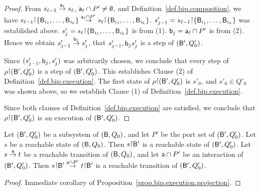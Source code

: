 \begin{proof}
From $s_{\l-1} \goestog[\act_{\l}] s_{\l}$,    $\act_{\l} \ints P' \ne \emptyset$, and Definition~\ref{def.bip.composition}, we have  %
        $s_{\l-1} \pj \set{\B_{i_1},\dots,\B_{i_k}} \goestog[\act_{\l} \ints P'] s_{\l} \pj \set{\B_{i_1},\dots,\B_{i_k}}$.
$s'_{j-1} = s_{\l-1} \pj \set{\B_{i_1},\dots,\B_{i_k}}$ was established above.
$s'_j = s_{\l} \pj \set{\B_{i_1},\dots,\B_{i_k}}$ is from (1).
$\actb_j = \act_{\l} \ints P'$ is from (2).
Hence we obtain $s'_{j-1} \goestog[\actb_j] s'_j$, \ie that $s'_{j-1}, \actb_j s'_j$ is a step of  $(\B', Q'_0)$.

Since $(s'_{j-1}, \actb_j, s'_j)$ was arbitrarily chosen, we conclude that
every step of $\rho \pj (\B', Q'_0)$  is a step of $(\B', Q'_0)$. This establishes Clause (2) of Definition~\ref{def.bip.execution}.
%
The first state of
$\rho \pj (\B', Q'_0)$  is $s'_0$, and $s'_0 \in Q'_0$ was shown above, so we establish Clause (1) of Definition~\ref{def.bip.execution}.

Since both clauses of Definition~\ref{def.bip.execution} are satisfied, we conclude that $\rho \pj (\B', Q'_0)$ is an execution of $(\B', Q'_0)$.
\end{proof}


\begin{corollary} \label{cor.bip.reachability} \label{cor:bip.reachability}
Let $(\B', Q'_0)$ be a subsystem of $(\B, Q_0)$, and let $P'$ be the port set of $(\B', Q'_0)$.
Let $s$ be a reachable state of $(\B, Q_0)$. Then $s \pj \B'$ is a reachable state of  $(\B',Q'_0)$. Let $s \la{\act} t$ be
a reachable transition of $(\B, Q_0)$, and let $\act \ints P'$ be an interaction of
 $(\B', Q'_0)$. Then  $s \pj \B' \la{\act \ints P'} t \pj \B'$ is a reachable transition of $(\B', Q'_0)$.
\end{corollary}
%
\begin{proof}
Immediate corollary of Proposition~\ref{prop.bip.execution.projection}.
\end{proof}






